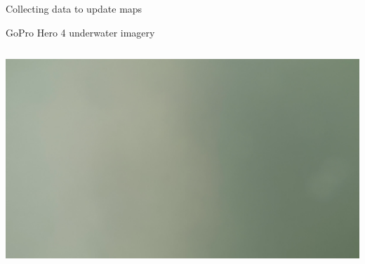 \documentclass[9pt,xcolor=table]{beamer}
\begin{document}
\begin{frame}{Collecting data to update maps}
\begin{block}{GoPro Hero 4 underwater imagery}
\begin{columns}
\begin{column}{0.33\textwidth}
            \includegraphics[width=\textwidth,trim={0cm 0cm 0cm 0cm},clip]{img/seagrass_field2_file2-00057.png}      \end{column}
        \end{columns}
    \end{block}
\end{frame}
\end{document}
